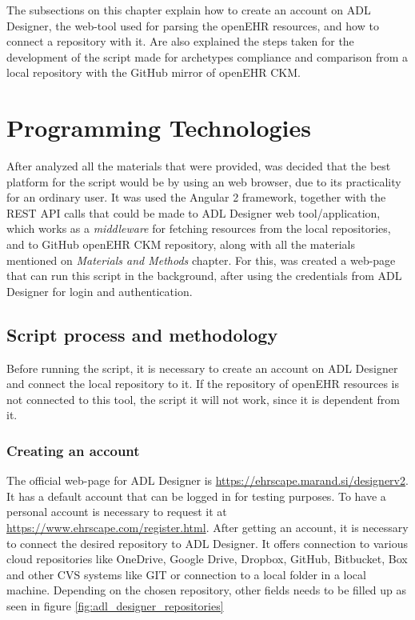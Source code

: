 \documentclass[mim_thesis.tex]{subfiles}
\begin{document}
The subsections on this chapter explain how to create an account on ADL Designer, the web-tool used for parsing the openEHR resources, and how to connect a repository with it. Are also explained the steps taken for the development of the script made for archetypes compliance and comparison from a local repository with the GitHub mirror of openEHR CKM.  

\section{Programming Technologies}
After analyzed all the materials that were provided, was decided that the best platform for the script would be by using an web browser, due to its practicality for an ordinary user. It was used the Angular 2 framework, together with the REST API calls that could be made to ADL Designer web tool/application, which works as a \textit{middleware} for fetching resources from the local repositories, and to GitHub openEHR CKM repository, along with all the materials mentioned on \textit{Materials and Methods} chapter. For this, was created a web-page that can run this script in the background, after using the credentials from ADL Designer for login and authentication.

\subsection{Script process and methodology}

Before running the script, it is necessary to create an account on ADL Designer and connect the local repository to it. If the repository of openEHR resources is not connected to this tool, the script it will not work, since it is dependent from it.

\subsubsection{Creating an account}
The official web-page for ADL Designer is \url{https://ehrscape.marand.si/designerv2}. It has a default account that can be logged in for testing purposes. To have a personal account is necessary to request it at \url{https://www.ehrscape.com/register.html}.
After getting an account, it is necessary to connect the desired repository to ADL Designer. It offers connection to various cloud repositories like OneDrive, Google Drive, Dropbox, GitHub, Bitbucket, Box and other CVS systems like GIT or connection to a local folder in a local machine. Depending on the chosen repository, other fields needs to be filled up as seen in figure \ref{fig:adl_designer_repositories}
\end{document}
